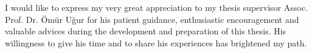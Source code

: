 I would like to express my very great appreciation to my thesis supervisor Assoc. Prof. Dr. \"Om\"ur U{\u{g}}ur for his patient guidance, enthusiastic encouragement and valuable advices during the development and preparation of this thesis. His willingness to give his time and to share his experiences has brightened my path.

